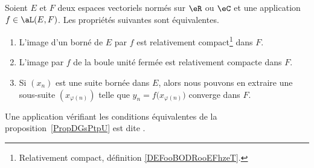 \begin{propositionDef} \label{PropDGsPtpU}
	Soient \( E\) et \( F\) deux espaces vectoriels normés sur \( \eR\) ou \( \eC\) et une application \( f\in\aL(E,F)\). Les propriétés suivantes sont équivalentes.
	\begin{enumerate}
		\item       \label{ITEMooAFNXooUGbZsh}
		      L'image d'un borné de \( E\) par \( f\) est relativement compact\footnote{Relativement compact, définition \ref{DEFooBODRooEFhzeT}.} dans \( F\).
		\item   \label{ItemJIkpUbLii}
		      L'image par \( f\) de la boule unité fermée est relativement compacte dans \( F\).
		\item   \label{ITEMooQKISooBpyyee}
		      Si \( (x_n)\) est une suite bornée dans \( E\), alors nous pouvons en extraire une sous-suite \( (x_{\varphi(n)})\) telle que
		      \( y_n = f\big( x_{\varphi(n)} \big)\) converge dans \( F\).
	\end{enumerate}
	Une application vérifiant les conditions équivalentes de la proposition~\ref{PropDGsPtpU} est dite .
\end{propositionDef}

